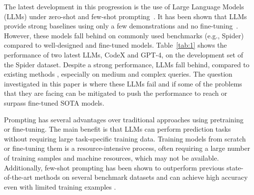 The latest development in this progression is the use of Large Language Models (LLMs) under zero-shot and few-shot prompting~\citep{rajkumar2022evaluating,liu2023comprehensive}. It has been shown that LLMs provide strong baselines using only a few demonstrations and no fine-tuning~\citep{chen2021evaluating,brown2020language,liu2023pre}. However, these models fall behind on commonly used benchmarks (e.g., Spider) compared to well-designed and fine-tuned models.
Table~\ref{tab:1} shows the performance of two latest LLMs, CodeX and GPT-4, on the development set of the Spider dataset. Despite a strong performance, LLMs fall behind, compared to existing methods \citep{scholak2021picard,li2023decoupling}, especially on medium and complex queries. The question investigated in this paper is where these LLMs fail and if some of the problems that they are facing can be mitigated to push the performance to reach or surpass fine-tuned SOTA models.

Prompting has several advantages over traditional approaches using pretraining or fine-tuning. The main benefit is that LLMs can perform prediction tasks without requiring large task-specific training data. Training models from scratch or fine-tuning them is a resource-intensive process, often requiring a large number of training samples and machine resources, which may not be available. Additionally, few-shot prompting has been shown to outperform previous state-of-the-art methods on several benchmark datasets and can achieve high accuracy even with limited training examples \citep{brown2020language, wei2022chain}. 

